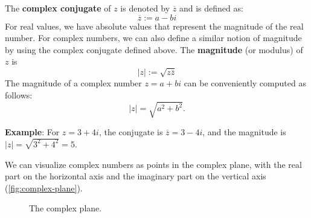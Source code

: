 The \textbf{complex conjugate} of $ z $ is denoted by $\overline{z}$ and is defined as:
\begin{equation*}
  \overline{z} := a - b i
\end{equation*}
For real values, we have absolute values that represent the magnitude of the real number.
For complex numbers, we can also define a similar notion of magnitude by using the complex conjugate defined above.
The \textbf{magnitude} (or modulus) of $ z $ is
\begin{equation*}
  |z| := \sqrt{z \overline{z}}
\end{equation*}
The magnitude of a complex number $ z = a + bi $ can be conveniently computed as follows:
\begin{equation*}
  |z| = \sqrt{a^2 + b^2}.
\end{equation*}

\begin{exampleBox}
    \textbf{Example}: For $ z = 3 + 4i $, the conjugate is $ \overline{z} = 3 - 4i $, and the magnitude is $ |z| = \sqrt{3^2 + 4^2} = 5 $.
\end{exampleBox}

We can visualize complex numbers as points in the complex plane, with the real part on the horizontal axis and the imaginary part on the vertical axis (\autoref{fig:complex-plane}).

\begin{figure}[H]
  \centering
  \caption{The complex plane.}
    \label{fig:complex-plane}
\end{figure}

